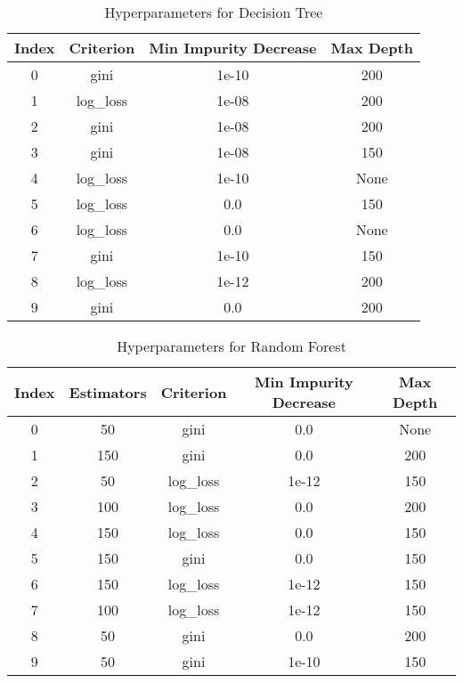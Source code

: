 \begin{table*}
    \centering
    \begin{tabular}{@{}cccc@{}}
        \toprule
        \textbf{Index} & \textbf{Criterion} & \textbf{Min Impurity Decrease} & \textbf{Max Depth} \\ \midrule
        0 & gini & 1e-10 & 200 \\
        1 & log\_loss & 1e-08 & 200 \\
        2 & gini & 1e-08 & 200 \\
        3 & gini & 1e-08 & 150 \\
        4 & log\_loss & 1e-10 & None \\
        5 & log\_loss & 0.0 & 150 \\
        6 & log\_loss & 0.0 & None \\
        7 & gini & 1e-10 & 150 \\
        8 & log\_loss & 1e-12 & 200 \\
        9 & gini & 0.0 & 200 \\ \bottomrule
    \end{tabular}
    \caption{Hyperparameters for Decision Tree}
    \label{tab:dt_search_spaces}
\end{table*}


\begin{table*}
    \centering
    \begin{tabular}{@{}ccccc@{}}
        \toprule
        \textbf{Index} & \textbf{Estimators} & \textbf{Criterion} & \textbf{Min Impurity Decrease} & \textbf{Max Depth} \\ \midrule
        0 & 50 & gini & 0.0 & None \\
        1 & 150 & gini & 0.0 & 200 \\
        2 & 50 & log\_loss & 1e-12 & 150 \\
        3 & 100 & log\_loss & 0.0 & 200 \\
        4 & 150 & log\_loss & 0.0 & 150 \\
        5 & 150 & gini & 0.0 & 150 \\
        6 & 150 & log\_loss & 1e-12 & 150 \\
        7 & 100 & log\_loss & 1e-12 & 150 \\
        8 & 50 & gini & 0.0 & 200 \\
        9 & 50 & gini & 1e-10 & 150 \\ \bottomrule
    \end{tabular}
    \caption{Hyperparameters for Random Forest}
    \label{tab:rf_search_spaces}
\end{table*}

